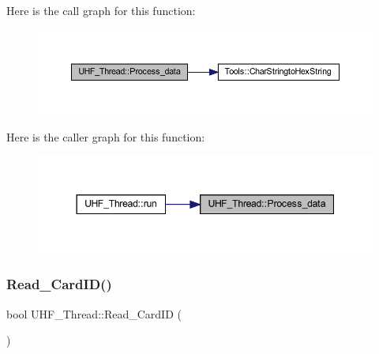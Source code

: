 Here is the call graph for this function\+:
\nopagebreak
\begin{figure}[H]
\begin{center}
\leavevmode
\includegraphics[width=350pt]{class_u_h_f___thread_a5e287beadcbcccffcd5859fa25263785_cgraph}
\end{center}
\end{figure}
Here is the caller graph for this function\+:
\nopagebreak
\begin{figure}[H]
\begin{center}
\leavevmode
\includegraphics[width=344pt]{class_u_h_f___thread_a5e287beadcbcccffcd5859fa25263785_icgraph}
\end{center}
\end{figure}
\mbox{\label{class_u_h_f___thread_a5c1a49f76f8e3a29fb009b7d638e5488}} 
\subsubsection{\texorpdfstring{Read\_CardID()}{Read\_CardID()}}
{\footnotesize\ttfamily bool U\+H\+F\+\_\+\+Thread\+::\+Read\+\_\+\+Card\+ID (\begin{DoxyParamCaption}{ }\end{DoxyParamCaption})}

